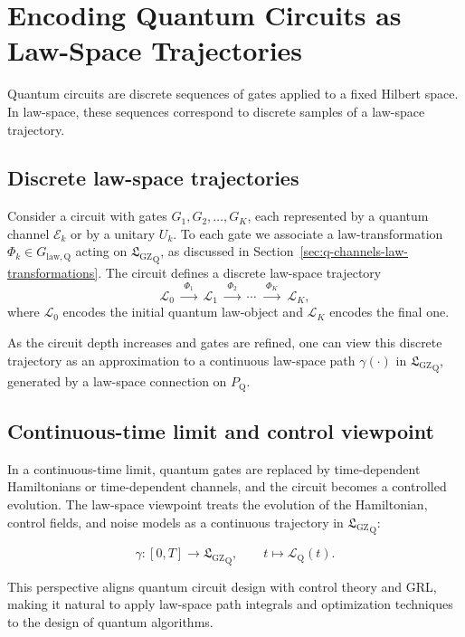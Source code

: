 \documentclass[11pt]{book}
\newcommand{\GZLS}{\ensuremath{\mathfrak{L}_{\mathrm{GZ}}}}
\newcommand{\Bundle}{\ensuremath{P}}
\theoremstyle{plain}
\theoremstyle{definition}
\theoremstyle{remark}
\begin{document}
\section{Encoding Quantum Circuits as Law-Space Trajectories}
\label{sec:circuits-law-trajectories}


Quantum circuits are discrete sequences of gates applied to a fixed
Hilbert space. In law-space, these sequences correspond to discrete
samples of a law-space trajectory.

\subsection*{Discrete law-space trajectories}

Consider a circuit with gates $G_1,G_2,\dots,G_K$, each represented
by a quantum channel $\mathcal{E}_k$ or by a unitary $U_k$. To each
gate we associate a law-transformation
$\Phi_k \in G_{\mathrm{law,Q}}$ acting on ${\GZLS}_{\mathrm{Q}}$, as
discussed in Section~\ref{sec:q-channels-law-transformations}. The
circuit defines a discrete law-space trajectory
\[
   \mathcal{L}_0 \;\xrightarrow{\;\Phi_1\;}\;
   \mathcal{L}_1 \;\xrightarrow{\;\Phi_2\;}\;
   \cdots \;\xrightarrow{\;\Phi_K\;}\; \mathcal{L}_K,
\]
where $\mathcal{L}_0$ encodes the initial quantum law-object and
$\mathcal{L}_K$ encodes the final one.

As the circuit depth increases and gates are refined, one can view
this discrete trajectory as an approximation to a continuous
law-space path $\gamma(\cdot)$ in ${\GZLS}_{\mathrm{Q}}$, generated by
a law-space connection on $\Bundle_{\mathrm{Q}}$.

\subsection*{Continuous-time limit and control viewpoint}

In a continuous-time limit, quantum gates are replaced by time-dependent
Hamiltonians or time-dependent channels, and the circuit becomes a
controlled evolution. The law-space viewpoint treats the evolution
of the Hamiltonian, control fields, and noise models as a continuous
trajectory in ${\GZLS}_{\mathrm{Q}}$:

\[
   \gamma \colon [0,T] \longrightarrow {\GZLS}_{\mathrm{Q}},
   \qquad t \longmapsto \mathcal{L}_{\mathrm{Q}}(t).
\]

This perspective aligns quantum circuit design with control theory
and GRL, making it natural to apply law-space path integrals and
optimization techniques to the design of quantum algorithms.
\end{document}
